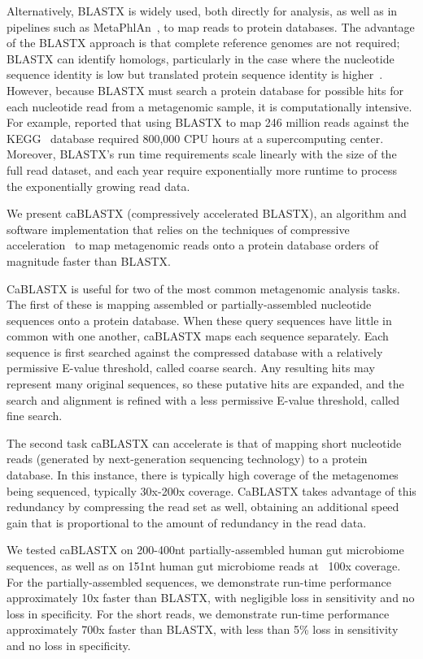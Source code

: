 \documentclass[review,preprint,12pt]{elsarticle}
\renewcommand{\cite}{\citep} %
\theoremstyle{definition}
\theoremstyle{remark}
\numberwithin{equation}{section}
\begin{document}
Alternatively, BLASTX is widely used, both directly for analysis, as well as in 
pipelines such as MetaPhlAn~\cite{segata2012metagenomic}, to map reads to 
protein databases.
The advantage of the BLASTX approach is that complete reference genomes are not
required; BLASTX can identify homologs, particularly in the case where the
nucleotide sequence identity is low but translated protein sequence identity
is higher~\cite{turnbaugh2006obesity, kurokawa2007comparative}.
However, because BLASTX must search a protein database for possible hits for
each nucleotide read from a metagenomic sample, it is computationally intensive.
For example, \citet{mackelprang2011metagenomic} reported that using BLASTX to 
map 246
million reads against the KEGG~\cite{kanehisa2000kegg} database required 
800,000 CPU hours at a supercomputing center.
Moreover, BLASTX's run time requirements scale linearly with the size of the 
full read dataset, and each year require exponentially more runtime to process 
the exponentially growing read data. 


We present caBLASTX (compressively accelerated BLASTX), an algorithm and 
software implementation that relies on the techniques of compressive 
acceleration~\cite{loh2012compressive, daniels2013compressive} to map 
metagenomic reads onto a protein database orders of magnitude faster than 
BLASTX.

CaBLASTX is useful for two of the most common metagenomic analysis tasks. 
The first of these is mapping assembled or partially-assembled
nucleotide sequences onto a protein database. 
When these query sequences have
little in common with one another, caBLASTX maps each sequence separately. 
Each sequence is first searched against the compressed database with a 
relatively permissive E-value threshold, called coarse search. 
Any resulting hits may represent many original sequences, so these putative 
hits are expanded, and the search and alignment is refined with a less 
permissive E-value threshold, called fine search.

The second task caBLASTX can accelerate is that of mapping short nucleotide
reads (generated by next-generation sequencing technology) to a protein
database. In this instance, there is typically high coverage of the metagenomes
being sequenced, typically 30x-200x coverage. CaBLASTX takes advantage of this
redundancy
by compressing the read set as well, obtaining an additional speed gain that is
proportional to the amount of redundancy in the read data.


We tested caBLASTX on 200-400nt partially-assembled human gut microbiome
sequences, as well as on 151nt human gut microbiome reads at ~100x coverage.
For the partially-assembled sequences, we demonstrate run-time performance
approximately 10x faster than BLASTX, with negligible loss in sensitivity and
no loss in specificity. For the short reads, we demonstrate run-time
performance approximately 700x faster than BLASTX, with less than 5\% loss in
sensitivity and no loss in specificity.
\end{document}
